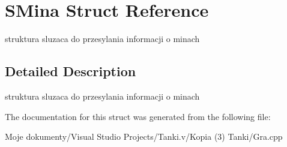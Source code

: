 \section{SMina Struct Reference}
\label{struct_s_mina}
struktura sluzaca do przesylania informacji o minach  




\subsection{Detailed Description}
struktura sluzaca do przesylania informacji o minach 



The documentation for this struct was generated from the following file:\begin{CompactItemize}
\item 
Moje dokumenty/Visual Studio Projects/Tanki.v/Kopia (3) Tanki/Gra.cpp\end{CompactItemize}
